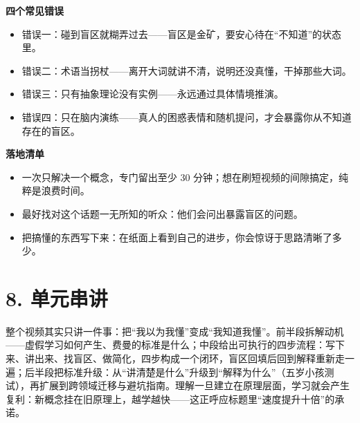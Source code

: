 \documentclass[UTF8,a4paper,11pt]{ctexart}
\begin{document}
\begin{keyconcept}
\textbf{四个常见错误}
\begin{itemize}
  \item 错误一：碰到盲区就糊弄过去——盲区是金矿，要安心待在“不知道”的状态里。
  \item 错误二：术语当拐杖——离开大词就讲不清，说明还没真懂，干掉那些大词。
  \item 错误三：只有抽象理论没有实例——永远通过具体情境推演。
  \item 错误四：只在脑内演练——真人的困惑表情和随机提问，才会暴露你从不知道存在的盲区。
\end{itemize}
\end{keyconcept}

\begin{center}
\end{center}

\begin{keyconcept}
\textbf{落地清单}
\begin{itemize}
  \item 一次只解决一个概念，专门留出至少 30 分钟；想在刷短视频的间隙搞定，纯粹是浪费时间。
  \item 最好找对这个话题一无所知的听众：他们会问出暴露盲区的问题。
  \item 把搞懂的东西写下来：在纸面上看到自己的进步，你会惊讶于思路清晰了多少。
\end{itemize}
\end{keyconcept}


\section*{8. 单元串讲}
整个视频其实只讲一件事：把“我以为我懂”变成“我知道我懂”。前半段拆解动机——虚假学习如何产生、费曼的标准是什么；中段给出可执行的四步流程：写下来、讲出来、找盲区、做简化，四步构成一个闭环，盲区回填后回到解释重新走一遍；后半段把标准升级：从“讲清楚是什么”升级到“解释为什么”（五岁小孩测试），再扩展到跨领域迁移与避坑指南。理解一旦建立在原理层面，学习就会产生复利：新概念挂在旧原理上，越学越快——这正呼应标题里“速度提升十倍”的承诺。
\end{document}
